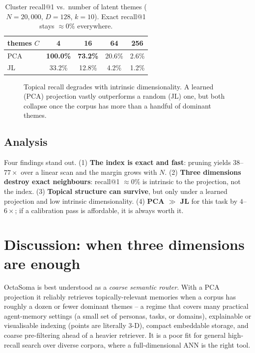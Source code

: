 \documentclass[11pt]{article}
\begin{document}
\begin{table}[t]
\centering
\caption{Cluster recall@1 vs.\ number of latent themes ($N{=}20{,}000$, $D{=}128$,
$k{=}10$). Exact recall@1 stays $\approx 0\%$ everywhere.}
\label{tab:sweep}
\begin{tabular}{lcccc}
\toprule
themes $C$ & 4 & 16 & 64 & 256 \\
\midrule
PCA & \textbf{100.0\%} & \textbf{73.2\%} & 20.6\% & 2.6\% \\
JL  & 33.2\%           & 12.8\%          & 4.2\%  & 1.2\% \\
\bottomrule
\end{tabular}
\end{table}

\begin{figure}[t]
\centering
{}
\caption{Topical recall degrades with intrinsic dimensionality. A learned (PCA)
projection vastly outperforms a random (JL) one, but both collapse once the
corpus has more than a handful of dominant themes.}
\label{fig:sweep}
\end{figure}

\subsection{Analysis}
Four findings stand out. (1) \textbf{The index is exact and fast}: pruning yields
$38$--$77\times$ over a linear scan and the margin grows with $N$. (2)
\textbf{Three dimensions destroy exact neighbours}: recall@1 $\approx 0\%$ is
intrinsic to the projection, not the index. (3) \textbf{Topical structure can
survive}, but only under a learned projection and low intrinsic dimensionality.
(4) \textbf{PCA $\gg$ JL} for this task by $4$--$6\times$; if a calibration pass is
affordable, it is always worth it.

\section{Discussion: when three dimensions are enough}
OctaSoma is best understood as a \emph{coarse semantic router}. With a PCA
projection it reliably retrieves topically-relevant memories when a corpus has
roughly a dozen or fewer dominant themes -- a regime that covers many practical
agent-memory settings (a small set of personas, tasks, or domains), explainable
or visualisable indexing (points are literally 3-D), compact embeddable storage,
and coarse pre-filtering ahead of a heavier retriever. It is a poor fit for
general high-recall search over diverse corpora, where a full-dimensional ANN is
the right tool.
\end{document}
